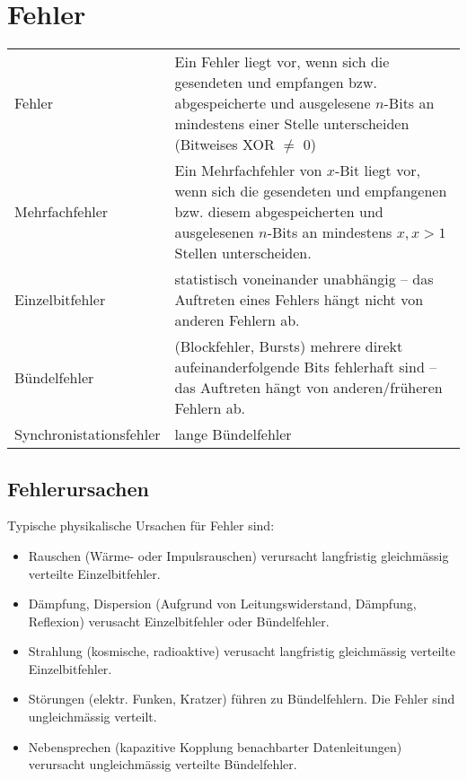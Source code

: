 \section{Fehler}
\settowidth{\MyLenA}{Synchronistationsfehler~~}
\begin{tabular}{@{}p{\the\MyLenA}%
				@{}p{\linewidth-\the\MyLenA}}
	Fehler & Ein Fehler liegt vor, wenn sich die gesendeten und empfangen bzw. abgespeicherte und ausgelesene $n$-Bits
	an mindestens einer Stelle unterscheiden (Bitweises XOR $\neq$ 0)\\
	Mehrfachfehler & Ein Mehrfachfehler von $x$-Bit liegt vor, wenn sich die gesendeten und empfangenen bzw. diesem
	abgespeicherten und ausgelesenen $n$-Bits an mindestens $x, x > 1$ Stellen unterscheiden.\\
	Einzelbitfehler & statistisch voneinander unabhängig -- das Auftreten eines Fehlers hängt nicht von
	anderen Fehlern ab.\\
	Bündelfehler  & (Blockfehler, Bursts) mehrere direkt aufeinanderfolgende Bits fehlerhaft
	sind -- das Auftreten hängt von anderen/früheren Fehlern ab.\\
	Synchronistationsfehler & lange Bündelfehler
\end{tabular}

\subsection{Fehlerursachen}
Typische physikalische Ursachen für Fehler sind:
\begin {itemize}
	\item Rauschen (Wärme- oder Impulsrauschen) verursacht langfristig gleichmässig verteilte Einzelbitfehler. 
	\item Dämpfung, Dispersion (Aufgrund von Leitungswiderstand, Dämpfung, Reflexion) verusacht Einzelbitfehler oder Bündelfehler.
	\item Strahlung (kosmische, radioaktive) verusacht langfristig gleichmässig verteilte Einzelbitfehler. 
	\item Störungen (elektr. Funken, Kratzer) führen zu Bündelfehlern. Die Fehler sind ungleichmässig verteilt.
	\item Nebensprechen (kapazitive Kopplung benachbarter Datenleitungen) verursacht ungleichmässig verteilte Bündelfehler.
\end{itemize}

